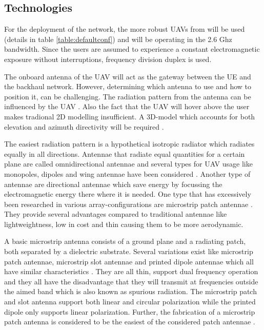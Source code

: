 \documentclass[twocolumn]{phdsymp} %
\begin{document}
\subsection{Technologies}

For the deployment of the network, the more robust \gls{UAV}s from \cite{J2} will be used (details in table \ref{table:defaultconf}) and will be operating in the 2.6 Ghz 
bandwidth. Since the users are assumed to experience a constant electromagnetic exposure without interruptions, frequency division duplex is used.

The onboard antenna of the \gls{UAV} will act as the gateway between the UE and the backhaul network.
However, determining which antenna to use and how to position it, can be challenging.
The radiation pattern from the antenna can be influenced by the \gls{UAV} \cite{A1}.
Also the fact that the \gls{UAV} will hover above the user makes tradional 2D modelling insufficient.
A 3D-model which accounts for both elevation and azimuth directivity 
will be required \cite{U12}.

The easiest radiation pattern is a hypothetical isotropic radiator which radiates equally in all directions.
Antennae that radiate equal quantities for a certain plane are called omnidirectional antennae \cite{U12} and several types 
for \gls{UAV} usage like monopoles, dipoles and wing antennae 
have been considered \cite{A4,A10,A11,A12}.
Another type of antennae are directional antennae which save energy by focussing the electromagnetic energy there where it 
is needed. One type 
that has excessively been researched in various array-configurations are microstrip patch antennae \cite{A5,A6,A8}.
They provide several advantages compared to traditional antennae \cite{J13_microstripadvantages,J14_antennadesign}
like lightweightness, low in cost and thin causing them to be more aerodynamic. 

A basic microstrip antenna consists of a ground plane and
a radiating patch, both separated by a dielectric substrate. 
Several variations exist like microstrip patch antennae, microstrip slot antennae and printed dipole antennae which
all have similar characteristics \cite{J13_microstripadvantages, J14_antennadesign}. 
They are all thin, support dual frequency operation and they all have the disadvantage that 
they 
will transmit at frequencies outside the aimed band which is also known as
spurious radiation. The microstrip patch and slot antenna support both linear
and circular polarization while the printed dipole only supports linear polarization. 
Further, the fabrication of a microstrip patch antenna is considered to be the easiest 
of the considered patch antennae \cite{J13_microstripadvantages}. 
\end{document}
